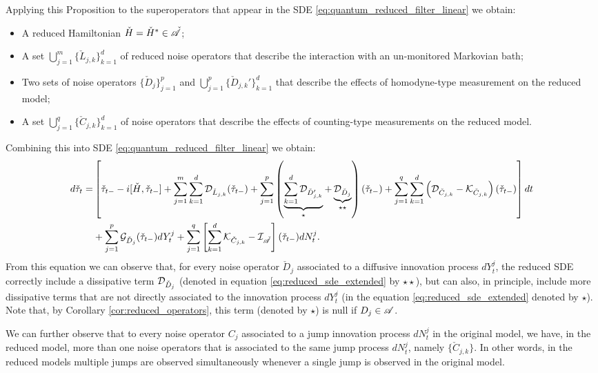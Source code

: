 \documentclass[aihp,12pt]{imsart}
\begin{document}
Applying this Proposition to the superoperators that appear in the SDE \eqref{eq:quantum_reduced_filter_linear} we obtain: 
\begin{itemize}
    \item A reduced Hamiltonian $\check{H}=\check{H}^*\in\check{\mathscr{A}}$; 
    \item A set $\bigcup_{j=1}^m\{\check{L}_{j,k}\}_{k=1}^{d}$ of reduced noise operators that describe the interaction with an un-monitored Markovian bath; 
    \item Two sets of noise operators $\{\check{D}_j\}_{j=1}^{p}$ and $\bigcup_{j=1}^p\{\check{D}_{j,k}'\}_{k=1}^{d}$ that describe the effects of homodyne-type measurement on the reduced model; 
    \item A set $\bigcup_{j=1}^q\{\check{C}_{j,k}\}_{k=1}^{d}$ of noise operators that describe the effects of counting-type measurements on the reduced model.
\end{itemize}
Combining this into SDE \eqref{eq:quantum_reduced_filter_linear} we obtain:
\begin{align}
\begin{split}
    d\check{\tau}_t =& \left[\check{\tau}_{t-}-i[{\check{H}},\check{\tau}_{t-}] + \sum_{j=1}^m \sum_{k=1}^{d} \mathcal{D}_{\check{L}_{j,k}}(\check{\tau}_{t-}) + \sum_{j=1}^p \left( \underbrace{\sum_{k=1}^{d} \mathcal{D}_{\check{D}_{j,k}'}}_{\star} +  \underbrace{\mathcal{D}_{\check{D}_j}}_{\star\star} \right)(\check{\tau}_{t-}) + \sum_{j=1}^{q} \sum_{k=1}^{d} \left(\mathcal{D}_{\check{C}_{j,k}}-\mathcal{K}_{\check{C}_{j,k}}\right)(\check{\tau}_{t-}) \right]dt \\
    &+ \sum_{j=1}^{p}\mathcal{G}_{\check{D}_j}(\check{\tau}_{t-}) dY_t^j + \sum_{j=1}^{q}  \left[ \sum_{k=1}^{d} \mathcal{K}_{\check{C}_{j,k}} - \mathcal{I}_{\check{\mathscr{A}}} \right](\check{\tau}_{t-})dN_t^j.
\end{split}
    \label{eq:reduced_sde_extended}
\end{align}
From this equation we can observe that, for every noise operator $\check{D}_j$ associated to a diffusive innovation process $dY_t^j$, the reduced SDE correctly include a dissipative term $\mathcal{D}_{\check{D}_j}$ (denoted in equation \eqref{eq:reduced_sde_extended} by $\star\star$), but can also, in principle, include more dissipative terms that are not directly associated to the innovation process $dY_t^j$ (in the equation \eqref{eq:reduced_sde_extended} denoted by $\star$). Note that, by Corollary \ref{cor:reduced_operators}, this term (denoted by $\star$) is null if $D_j\in\mathscr{A}$. 

We can further observe that to every noise operator $C_j$ associated to a jump innovation process $dN_t^j$ in the original model, we have, in the reduced model, more than one noise operators that is associated to the same jump process $dN_t^j$, namely $\{\check{C}_{j,k}\}$. In other words, in the reduced models multiple jumps are observed simultaneously whenever a single jump is observed in the original model. 
\end{document}
